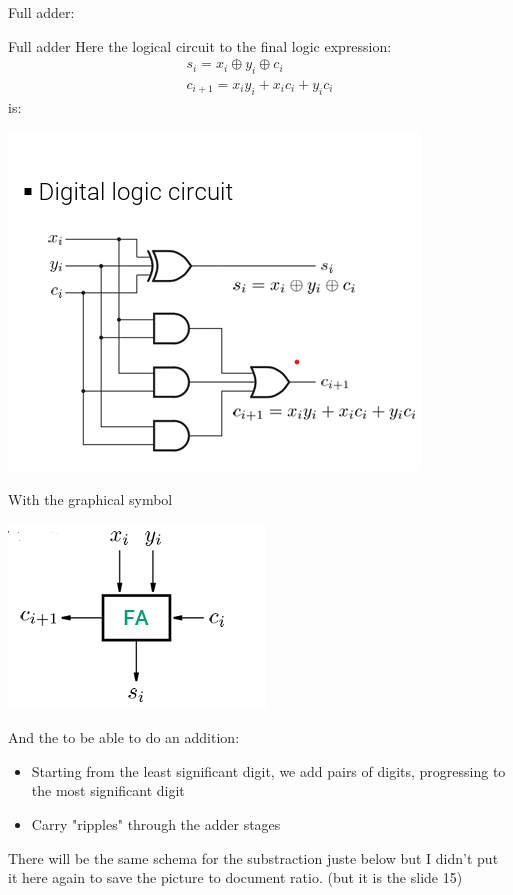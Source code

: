 \begin{parag}{Full adder:}
    \begin{subparag}{Full adder}
        Here the logical circuit to the final logic expression:
        \begin{align*}
            s_i = x_i \oplus y_i \oplus c_i \\
            c_{i+1} = x_iy_i + x_ic_i + y_ic_i
        \end{align*}
        is:
        \begin{center}
            \includegraphics[scale=0.8]{32025-03-14.png}
        \end{center}
    With the graphical symbol     
        \begin{center}
            \includegraphics[scale=1.1]{42025-03-14.png}
        \end{center}
   \end{subparag}
   And the to be able to do an addition:
   \begin{itemize}
       \item Starting from the least significant digit, we add pairs of digits, progressing to the most significant digit
       \item Carry "ripples" through the adder stages
   \end{itemize}
   \begin{framedremark}
       There will be the same schema for the substraction juste below but I didn't put it here again to save the picture to document ratio. (but it is the slide 15)
   \end{framedremark}
   
\end{parag}
